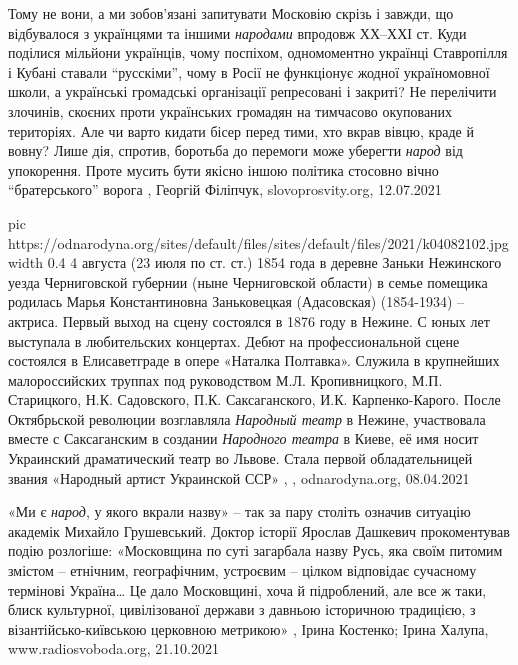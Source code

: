 Тому не вони, а ми зобов’язані запитувати Московію скрізь і завжди, що
відбувалося з українцями та іншими \emph{народами} впродовж ХХ–ХХІ ст. Куди поділися
мільйони українців, чому поспіхом, одномоментно українці Ставропілля і Кубані
ставали \enquote{русскіми}, чому в Росії не функціонує жодної україномовної школи, а
українські громадські організації репресовані і закриті?  Не перелічити
злочинів, скоєних проти українських громадян на тимчасово окупованих
територіях. Але чи варто кидати бісер перед тими, хто вкрав вівцю, краде й
вовну? Лише дія, спротив, боротьба до перемоги може уберегти \emph{народ} від
упокорення. Проте мусить бути якісно іншою політика стосовно вічно
\enquote{братерського} ворога
, Георгій Філіпчук, slovoprosvity.org, 12.07.2021

\ifcmt
  pic https://odnarodyna.org/sites/default/files/sites/default/files/2021/k04082102.jpg
  width 0.4
\fi
4 августа (23 июля по ст. ст.) 1854 года в деревне Заньки Нежинского уезда
Черниговской губернии (ныне Черниговской области) в семье помещика родилась
Марья Константиновна Заньковецкая (Адасовская) (1854-1934) – актриса. Первый
выход на сцену состоялся в 1876 году в Нежине. С юных лет выступала в
любительских концертах. Дебют на профессиональной сцене состоялся в
Елисаветграде в опере «Наталка Полтавка». Служила в крупнейших малороссийских
труппах под руководством М.Л. Кропивницкого, М.П. Старицкого, Н.К. Садовского,
П.К. Саксаганского, И.К. Карпенко-Карого. После Октябрьской революции
возглавляла \emph{Народный театр} в Нежине, участвовала вместе с Саксаганским в
создании \emph{Народного театра} в Киеве, её имя носит Украинский драматический театр
во Львове. Стала первой обладательницей звания «Народный артист Украинской ССР»
, , odnarodyna.org, 08.04.2021

«Ми є \emph{народ}, у якого вкрали назву» – так за пару століть означив ситуацію
академік Михайло Грушевський.  Доктор історії Ярослав Дашкевич прокоментував
подію розлогіше: «Московщина по суті загарбала назву Русь, яка своїм питомим
змістом – етнічним, географічним, устроєвим – цілком відповідає сучасному
термінові Україна… Це дало Московщині, хоча й підроблений, але все ж таки,
блиск культурної, цивілізованої держави з давньою історичною традицією, з
візантійсько-київською церковною метрикою»
, 
Ірина Костенко; Ірина Халупа, www.radiosvoboda.org, 21.10.2021

